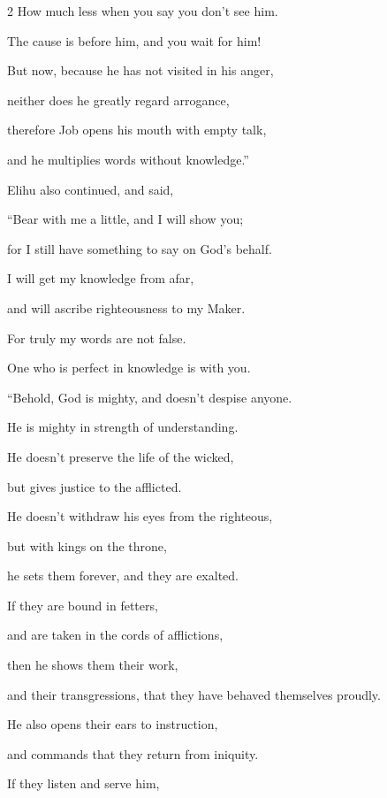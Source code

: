 \begin{multicols}{2}
	\myverse{}How much less when you say you don’t see him.
	
	The cause is before him, and you wait for him!
	
	\myverse{}But now, because he has not visited in his anger,
	
	neither does he greatly regard arrogance,
	
	\myverse{}therefore Job opens his mouth with empty talk,
	
	and he multiplies words without knowledge.”
	
	
	
	\mychapter{} \myverse*{}Elihu also continued, and said,
	
	\quad\quad \myverse{}“Bear with me a little, and I will show you;
	
	for I still have something to say on God’s behalf.
	
	\myverse{}I will get my knowledge from afar,
	
	and will ascribe righteousness to my Maker.
	
	\myverse{}For truly my words are not false.
	
	One who is perfect in knowledge is with you.
	
	\vspace{\baselineskip}
	
	\myverse{}“Behold, God is mighty, and doesn’t despise anyone.
	
	He is mighty in strength of understanding.
	
	\myverse{}He doesn’t preserve the life of the wicked,
	
	but gives justice to the afflicted.
	
	\myverse{}He doesn’t withdraw his eyes from the righteous,
	
	but with kings on the throne,
	
	he sets them forever, and they are exalted.
	
	\myverse{}If they are bound in fetters,
	
	and are taken in the cords of afflictions,
	
	\myverse{}then he shows them their work,
	
	and their transgressions, that they have behaved themselves proudly.
	
	\myverse{}He also opens their ears to instruction,
	
	and commands that they return from iniquity.
	
	\myverse{}If they listen and serve him,
	

\end{multicols}
